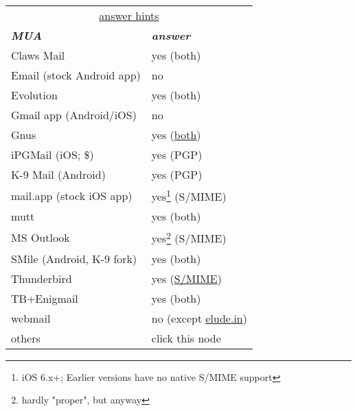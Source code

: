 \documentclass[12pt]{scrartcl}
\begin{document}
\begin{preview}
  \fontsize{4mm}{4mm}\selectfont 
  \begin{minipage}{6cm} %
    \begin{tabular}{lp{26mm}}
      \multicolumn{2}{|c|}{\underline{answer hints}}\\
      \textsl{\textbf{MUA}}          & \textsl{\textbf{answer}}\\
      Claws Mail                     & yes (both)\\
      Email \tiny(stock Android app) & no\\
      Evolution                      & yes (both)\\
      Gmail app \tiny(Android/iOS)   & no\\
      Gnus                           & yes (\href{https://www.emacswiki.org/emacs/GnusSMIME}{both})\\
      iPGMail \tiny(iOS; \$)         & yes (PGP)\\
      K-9 Mail \tiny(Android)        & yes (PGP)\\
      mail.app \tiny(stock iOS app)  & yes\footnote[$\dagger$]{iOS 6.x+; Earlier versions have no native S/MIME support} (S/MIME)\\
      mutt                           & yes (both)\\
      MS Outlook                     & yes\footnote[$\star$]{hardly "proper", but anyway} (S/MIME)\\
      SMile \tiny(Android, K-9 fork) & yes (both)\\
      Thunderbird                    & yes (\href{http://kb.mozillazine.org/Installing_an_SMIME_certificate}{S/MIME})\\
      TB+Enigmail                    & yes (both)\\
      webmail                        & no \tiny(except \href{eludemaillhqfkh5.onion}{elude.in})\\
      others                         & click this node\\
    \end{tabular}
  \end{minipage}
\end{preview}
\end{document}
